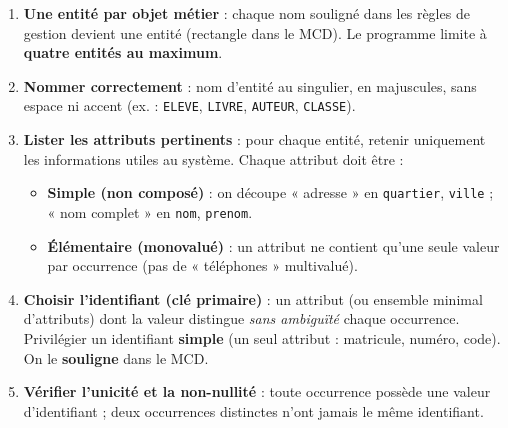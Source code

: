 \documentclass[11pt]{article}
\begin{document}
\begin{methode}
\begin{enumerate}
\item \textbf{Une entité par objet métier} : chaque nom souligné dans les règles de gestion devient une entité (rectangle dans le MCD). Le programme limite à \textbf{quatre entités au maximum}.
\item \textbf{Nommer correctement} : nom d'entité au singulier, en majuscules, sans espace ni accent (ex. : \texttt{ELEVE}, \texttt{LIVRE}, \texttt{AUTEUR}, \texttt{CLASSE}).
\item \textbf{Lister les attributs pertinents} : pour chaque entité, retenir uniquement les informations utiles au système. Chaque attribut doit être :
\begin{itemize}
\item \textbf{Simple (non composé)} : on découpe « adresse » en \texttt{quartier}, \texttt{ville} ; « nom complet » en \texttt{nom}, \texttt{prenom}.
\item \textbf{Élémentaire (monovalué)} : un attribut ne contient qu'une seule valeur par occurrence (pas de « téléphones » multivalué).
\end{itemize}
\item \textbf{Choisir l'identifiant (clé primaire)} : un attribut (ou ensemble minimal d'attributs) dont la valeur distingue \emph{sans ambiguïté} chaque occurrence. Privilégier un identifiant \textbf{simple} (un seul attribut : matricule, numéro, code). On le \textbf{souligne} dans le MCD.
\item \textbf{Vérifier l'unicité et la non-nullité} : toute occurrence possède une valeur d'identifiant ; deux occurrences distinctes n'ont jamais le même identifiant.
\end{enumerate}
\end{methode}
\end{document}
